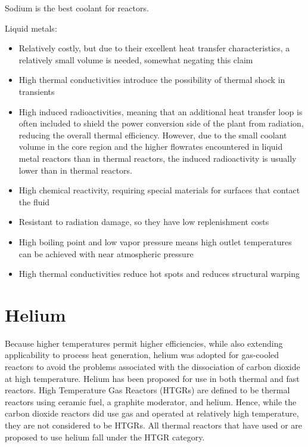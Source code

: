 \documentclass[10pt]{article}
\numberwithin{equation}{section} %
\begin{document}
Sodium is the best coolant for reactors.

Liquid metals: 

\begin{itemize}
\item Relatively costly, but due to their excellent heat transfer characteristics, a relatively small volume is needed, somewhat negating this claim
\item High thermal conductivities introduce the possibility of thermal shock in transients
\item High induced radioactivities, meaning that an additional heat transfer loop is often included to shield the power conversion side of the plant from radiation, reducing the overall thermal efficiency. However, due to the small coolant volume in the core region and the higher flowrates encountered in liquid metal reactors than in thermal reactors, the induced radioactivity is usually lower than in thermal reactors. 
\item High chemical reactivity, requiring special materials for surfaces that contact the fluid
\end{itemize}

\begin{itemize}
\item Resistant to radiation damage, so they have low replenishment costs
\item High boiling point and low vapor pressure means high outlet temperatures can be achieved with near atmospheric pressure
\item High thermal conductivities reduce hot spots and reduces structural warping
\end{itemize}

\section{Helium}

Because higher temperatures permit higher efficiencies, while also extending applicability to process heat generation, helium was adopted for gas-cooled reactors to avoid the problems associated with the dissociation of carbon dioxide at high temperature. Helium has been proposed for use in both thermal and fast reactors. High Temperature Gas Reactors (HTGRs) are defined to be thermal reactors using ceramic fuel, a graphite moderator, and helium. Hence, while the carbon dioxide reactors did use gas and operated at relatively high temperature, they are not considered to be HTGRs. All thermal reactors that have used or are proposed to use helium fall under the HTGR category. 
\end{document}
